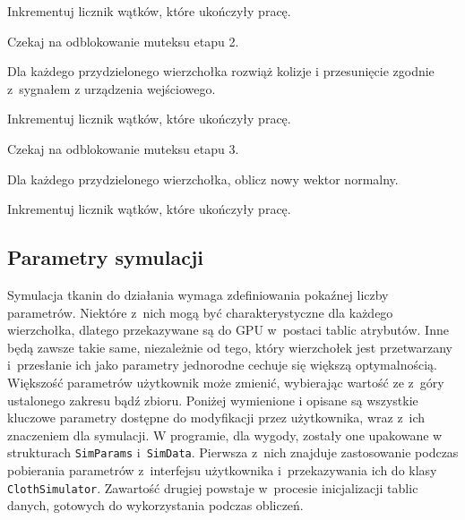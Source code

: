 \begin{algorithm}[H]
{				Inkrementuj licznik wątków, które ukończyły pracę.
				
				Czekaj na odblokowanie muteksu etapu 2.
				
				Dla każdego przydzielonego wierzchołka rozwiąż kolizje i przesunięcie zgodnie z~sygnałem z urządzenia wejściowego.
				
				Inkrementuj licznik wątków, które ukończyły pracę.
				
				Czekaj na odblokowanie muteksu etapu 3.
				
				Dla każdego przydzielonego wierzchołka, oblicz nowy wektor normalny.
				
				Inkrementuj licznik wątków, które ukończyły pracę.
			}
			
			\Indm
		\end{algorithm}
		
		\subsection{Parametry symulacji}
		\label{t:symulacja:dzialanie:parametry}
			
		
		Symulacja tkanin do działania wymaga zdefiniowania pokaźnej liczby parametrów. Niektóre z~nich mogą być charakterystyczne dla każdego wierzchołka, dlatego przekazywane są do GPU w~postaci tablic atrybutów. Inne będą zawsze takie same, niezależnie od tego, który wierzchołek jest przetwarzany i~przesłanie ich jako parametry jednorodne cechuje się większą optymalnością. Większość parametrów użytkownik może zmienić, wybierając wartość ze z~góry ustalonego zakresu bądź zbioru. Poniżej wymienione i opisane są wszystkie kluczowe parametry dostępne do modyfikacji przez użytkownika, wraz z~ich znaczeniem dla symulacji. W programie, dla wygody, zostały one upakowane w strukturach \texttt{SimParams} i~\texttt{SimData}. Pierwsza z~nich znajduje zastosowanie podczas pobierania parametrów z~interfejsu użytkownika i~przekazywania ich do klasy \texttt{ClothSimulator}. Zawartość drugiej powstaje w~procesie inicjalizacji tablic danych, gotowych do wykorzystania podczas obliczeń.
		
